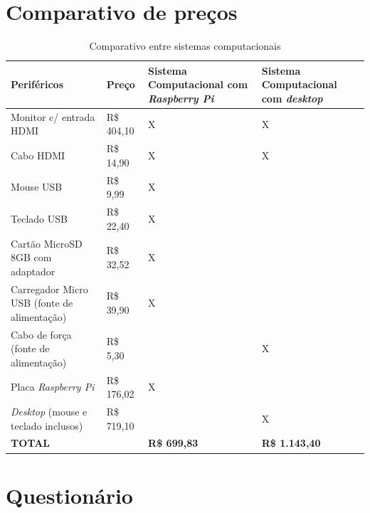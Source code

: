 \appendix

\chapter{Comparativo de preços}

\begin{table}[!htpb]
 \centering
    \begin{tabular}{|p{4cm}|p{2cm}|p{4cm}|p{4cm}|} 
    \hline
        \textbf{Periféricos} & \textbf{Preço} & \textbf{Sistema Computacional com \textit{Raspberry Pi}} & \textbf{Sistema Computacional com \textit{desktop}} \\
    \hline
        Monitor c/ entrada HDMI & R\$ 404,10 & X & X \\
    \hline
        Cabo HDMI & R\$ 14,90 & X & X \\
    \hline
        Mouse USB & R\$ 9,99 & X & \\
    \hline
        Teclado USB & R\$ 22,40 & X & \\
    \hline
        Cartão MicroSD 8GB com adaptador & R\$ 32,52 & X & \\
    \hline
        Carregador Micro USB (fonte de alimentação) & R\$ 39,90 & X & \\
    \hline
        Cabo de força (fonte de alimentação) & R\$ 5,30 & & X \\
    \hline
        Placa \textit{Raspberry Pi} & R\$ 176,02 & X & \\
    \hline
        \textit{Desktop} (mouse e teclado inclusos) & R\$ 719,10 & & X \\
    \hline
        \textbf{TOTAL} & & \textbf{R\$ 699,83} & \textbf{R\$ 1.143,40} \\
    \hline
    \end{tabular}
    \caption{Comparativo entre sistemas computacionais}
    \label{t_fixa}
\end{table}

\chapter{Questionário}

